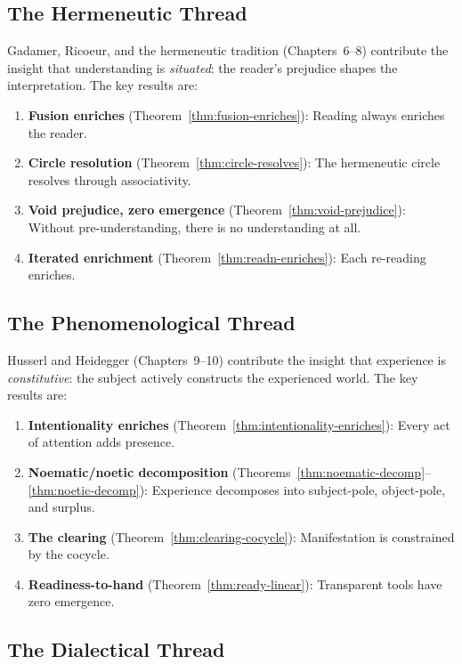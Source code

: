 \subsection{The Hermeneutic Thread}

Gadamer, Ricoeur, and the hermeneutic tradition (Chapters~6--8) contribute
the insight that understanding is \emph{situated}: the reader's prejudice shapes
the interpretation. The key results are:
\begin{enumerate}
\item \textbf{Fusion enriches} (Theorem~\ref{thm:fusion-enriches}): Reading
always enriches the reader.
\item \textbf{Circle resolution} (Theorem~\ref{thm:circle-resolves}): The
hermeneutic circle resolves through associativity.
\item \textbf{Void prejudice, zero emergence} (Theorem~\ref{thm:void-prejudice}):
Without pre-understanding, there is no understanding at all.
\item \textbf{Iterated enrichment} (Theorem~\ref{thm:readn-enriches}): Each
re-reading enriches.
\end{enumerate}

\subsection{The Phenomenological Thread}

Husserl and Heidegger (Chapters~9--10) contribute the insight that experience
is \emph{constitutive}: the subject actively constructs the experienced world.
The key results are:
\begin{enumerate}
\item \textbf{Intentionality enriches} (Theorem~\ref{thm:intentionality-enriches}):
Every act of attention adds presence.
\item \textbf{Noematic/noetic decomposition}
(Theorems~\ref{thm:noematic-decomp}--\ref{thm:noetic-decomp}): Experience
decomposes into subject-pole, object-pole, and surplus.
\item \textbf{The clearing} (Theorem~\ref{thm:clearing-cocycle}): Manifestation
is constrained by the cocycle.
\item \textbf{Readiness-to-hand} (Theorem~\ref{thm:ready-linear}): Transparent
tools have zero emergence.
\end{enumerate}

\subsection{The Dialectical Thread}

